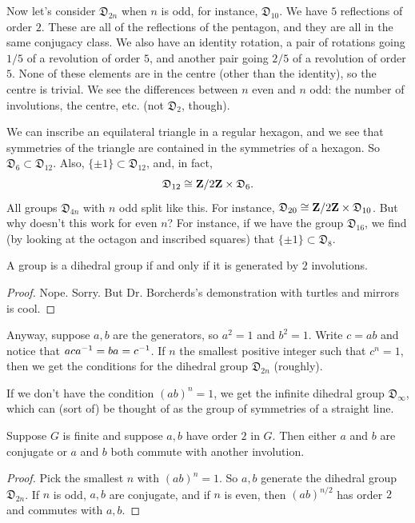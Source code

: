 \documentclass[11pt, twoside]{amsart}
\begin{document}
Now let's consider $\mathfrak{D}_{2n}$ when $n$ is odd, for instance, $\mathfrak{D}_{10}$.  We have $5$ reflections of order $2$. These are all of the reflections of the pentagon, and they are all in the same conjugacy class. We also have an identity rotation, a pair of rotations going $1/5$ of a revolution of order $5$,  and another pair going $2/5$ of a revolution of order $5$. None of these elements are in the centre (other than the identity), so the centre is trivial. We see the differences between $n$ even and $n$ odd: the number of involutions, the centre, etc. (not $\mathfrak{D}_2$, though).

We can inscribe an equilateral triangle in a regular hexagon, and we see that symmetries of the triangle are contained in the symmetries of a hexagon. So $\mathfrak{D}_6 \subset \mathfrak{D}_{12}$. Also, $\{\pm 1\}\subset \mathfrak{D}_{12}$, and, in fact, 
$$
\mathfrak{D}_{12} \cong \mathbf{Z}/2\mathbf{Z} \times \mathfrak{D}_6.
$$ 
All groups $\mathfrak{D}_{4n}$ with $n$ odd split like this. For instance, $\mathfrak{D}_{20} \cong \mathbf{Z}/2\mathbf{Z}\times \mathfrak{D}_{10}$. But why doesn't this work for even $n$? For instance, if we have the group $\mathfrak{D}_{16}$, we find (by looking at the octagon and inscribed squares) that $\{\pm 1\} \subset \mathfrak{D}_8$. 
\begin{proposition}
A group is a dihedral group if and only if it is generated by $2$ involutions. %
\end{proposition}
\begin{proof}
Nope. Sorry. But Dr. Borcherds's demonstration with turtles and mirrors is cool.%
\end{proof}

Anyway, suppose $a,b$ are the generators, so $a^2 = 1$ and $b^2 = 1$. Write $c = ab$ and notice that $aca^{-1} = ba = c^{-1}$. If $n$ the smallest positive integer such that $c^n=1$, then we get the conditions for the dihedral group $\mathfrak{D}_{2n}$ (roughly). 

If we don't have the condition $(ab)^n = 1$, we get the infinite dihedral group $\mathfrak{D}_\infty$, which can (sort of) be thought of as the group of symmetries of a straight line. 
\begin{proposition}
Suppose $G$ is finite and suppose $a,b$ have order $2$ in $G$. Then either $a$ and $b$ are conjugate or $a$ and $b$ both commute with another involution.
\end{proposition}
\begin{proof}
Pick the smallest $n$ with $(ab)^n = 1$. So $a,b$ generate the dihedral group $\mathfrak{D}_{2n}$. If $n$ is odd, $a,b$ are conjugate, and if $n$ is even, then $(ab)^{n/2}$ has order $2$ and commutes with $a,b$.
\end{proof}
\end{document}
